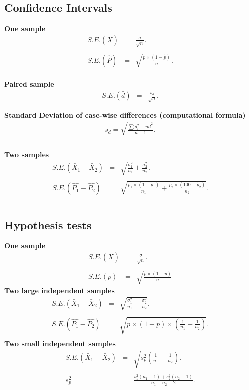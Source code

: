 
\subsection*{Confidence Intervals}
{\bf One sample}
\begin{eqnarray*} S.E.(\bar{X})&=&\frac{\sigma}{\sqrt{n}}.\\\\
	S.E.(\hat{P})&=&\sqrt{\frac{\hat{p}\times(1-\hat{p})}{n}}.\\
\end{eqnarray*}

{\bf Paired sample}
\begin{eqnarray*}
	S.E.(\bar{d})&=&\frac{s_d}{\sqrt{n}}.\\\\
\end{eqnarray*}
{\bf Standard Deviation of case-wise differences (computational formula)}
\begin{eqnarray*}
	s_d = \sqrt{ \frac{\sum d_i^2 - n\bar{d}^2 }{ n-1}}.\\\\
\end{eqnarray*}


{\bf Two samples}
\begin{eqnarray*}
	S.E.(\bar{X}_1-\bar{X}_2)&=&\sqrt{\frac{\sigma^2_1}{n_1}+\frac{\sigma_2^2}{n_2}}.\\\\
	S.E.(\hat{P_1}-\hat{P_2})&=&\sqrt{\frac{\hat{p}_1\times(1-\hat{p}_1)}{n_1}+\frac{\hat{p}_2\times(100-\hat{p}_2)}{n_2}}.\\\\
\end{eqnarray*}

\subsection*{Hypothesis tests}
{\bf One sample}
\begin{eqnarray*}
	S.E.(\bar{X})&=&\frac{\sigma}{\sqrt{n}}.\\\\
	S.E.(p)&=&\sqrt{\frac{p \times (1-p)}{n}}
\end{eqnarray*}
{\bf Two large independent samples}
\begin{eqnarray*}
	S.E.(\bar{X}_1-\bar{X}_2)&=&\sqrt{\frac{\sigma^2_1}{n_1}+\frac{\sigma_2^2}{n_2}}.\\\\
	S.E.(\hat{P_1}-\hat{P_2})&=&\sqrt{ \bar{p}\times(1-\bar{p}) \times \left(\frac{1}{n_1}+\frac{1}{n_2}\right)}.\\
\end{eqnarray*}
{\bf Two small independent samples}
\begin{eqnarray*}
	S.E.(\bar{X}_1-\bar{X}_2)&=&\sqrt{s_p^2\left(\frac{1}{n_1}+\frac{1}{n_2}\right)}.\\\\
	s_p^2&=&\frac{s_1^2(n_1-1)+s_2^2(n_2-1)}{n_1+n_2-2}.\\
\end{eqnarray*}
